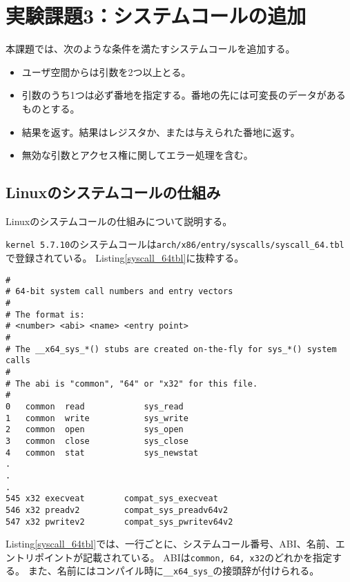 \documentclass[main]{subfiles}
\begin{document}
\section{実験課題3：システムコールの追加}

本課題では、次のような条件を満たすシステムコールを追加する。

\begin{itemize}
 \item ユーザ空間からは引数を2つ以上とる。
 \item 引数のうち1つは必ず番地を指定する。番地の先には可変長のデータがあるものとする。
 \item 結果を返す。結果はレジスタか、または与えられた番地に返す。
 \item 無効な引数とアクセス権に関してエラー処理を含む。
\end{itemize}

\subsection{Linuxのシステムコールの仕組み}

Linuxのシステムコールの仕組みについて説明する。

\texttt{kernel 5.7.10}のシステムコールは\texttt{arch/x86/entry/syscalls/syscall\_64.tbl}で登録されている。
Listing\ref{syscall_64tbl}に抜粋する。

\begin{lstlisting}[label=syscall_64tbl,caption=syscall\_64.tblの一部]
#
# 64-bit system call numbers and entry vectors
#
# The format is:
# <number> <abi> <name> <entry point>
#
# The __x64_sys_*() stubs are created on-the-fly for sys_*() system calls
#
# The abi is "common", "64" or "x32" for this file.
#
0	common	read			sys_read
1	common	write			sys_write
2	common	open			sys_open
3	common	close			sys_close
4	common	stat			sys_newstat
.
.
.
545	x32	execveat		compat_sys_execveat
546	x32	preadv2			compat_sys_preadv64v2
547	x32	pwritev2		compat_sys_pwritev64v2
\end{lstlisting}

Listing\ref{syscall_64tbl}では、一行ごとに、システムコール番号、ABI、名前、エントリポイントが記載されている。
ABIは\texttt{common, 64, x32}のどれかを指定する。
また、名前にはコンパイル時に\texttt{\_\_x64\_sys\_}の接頭辞が付けられる。
\end{document}
